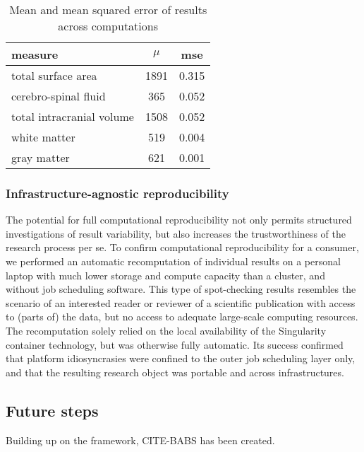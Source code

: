 \begin{table}
	\centering
	\begin{tabular}{lcc}
		\toprule
		measure & $\mu$ & \gls{mse} \\ \midrule
		total surface area & 1891 & 0.315 \\
		cerebro-spinal fluid & 365 & 0.052 \\
        total intracranial volume & 1508 & 0.052\\
        white matter & 519 & 0.004\\
        gray matter & 621 & 0.001\\
		\bottomrule
	\end{tabular}
	\caption[Mean and mean squared error of results across computations]{Mean and mean squared error of results across computations}
	\label{tab:fairly_mse}
\end{table}


\subsubsection{Infrastructure-agnostic reproducibility}

The potential for full computational reproducibility not only permits structured investigations of result variability, but also increases the trustworthiness of the research process per se.
To confirm computational reproducibility for a consumer, we performed an automatic recomputation of individual results on a personal laptop with much lower storage and compute capacity than a cluster, and without job scheduling software.
This type of spot-checking results resembles the scenario of an interested reader or reviewer of a scientific publication with access to (parts of) the data, but no access to adequate large-scale computing resources.
The recomputation solely relied on the local availability of the Singularity container technology, but was otherwise fully automatic.
Its success confirmed that platform idiosyncrasies were confined to the outer job scheduling layer only, and that the resulting research object was portable and across infrastructures.


\subsection{Future steps}


Building up on the framework, CITE-BABS has been created.





